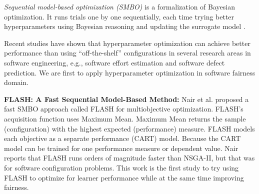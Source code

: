 \textit{Sequential model-based optimization (SMBO)} \cite{10.1007/978-3-642-25566-3_40} is a formalization of Bayesian optimization. It runs trials one by one sequentially, each time trying better hyperparameters using Bayesian reasoning and updating the surrogate model \cite{Will_Koehrsen}.

Recent studies have shown that hyperparameter optimization can achieve better performance than using ``off-the-shelf'' configurations in several research areas in software engineering, e.g., software effort estimation\cite{xia2018hyperparameter} and software defect prediction\cite{osman2017hyperparameter}. We are first to apply hyperparameter optimization in software fairness domain.

\textbf{FLASH: A Fast Sequential Model-Based Method:}
Nair et al. \cite{8469102} proposed a fast SMBO approach called FLASH for multiobjective optimization. FLASH's acquisition function uses Maximum Mean. Maximum Mean returns the sample (configuration) with the highest expected (performance) measure. FLASH models each objective as a separate performance (CART) model. Because the CART model can be trained for one performance measure or dependent value. Nair reports that FLASH runs orders of magnitude faster than NSGA-II, but that was for software configuration problems. This work is the first study to try using  FLASH to optimize for learner performance while at the same time improving fairness.




